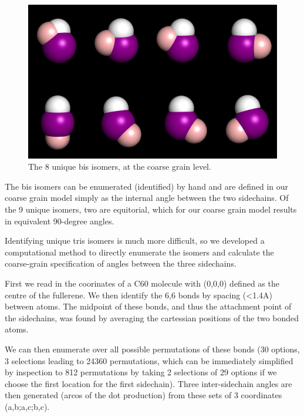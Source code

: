 \documentclass[journal=nanofd,manuscript=suppinfo]{achemso}
\begin{document}
\begin{figure}[ht!]
    \begin{center}
        \includegraphics[width=\textwidth]{bis_8_isomers_ray.png}
            \caption{\label{fig-8bisCG}The 8 unique bis isomers, at the coarse grain level.}
    \end{center}
\end{figure}

The bis isomers can be enumerated (identified) by hand and are defined in our
coarse grain model simply as the internal angle between the two sidechains. Of
the 9 unique isomers, two are equitorial, which for our coarse grain model
results in equivalent 90-degree angles.



Identifying unique tris isomers is much more difficult, so we developed
a computational method to directly enumerate the isomers and calculate the
coarse-grain specification of angles between the three sidechains.

First we read in the coorinates of a C60 molecule with (0,0,0) defined as the
centre of the fullerene. We then identify the 6,6 bonds by spacing (<1.4A)
between atoms.
The midpoint of these bonds, and thus the attachment point of the sidechains,
was found by averaging the cartessian positions of the two bonded atoms.

We can then enumerate over all possible permutations of these bonds (30
options, 3 selections leading to 24360 permutations, which can be immediately
simplified by inspection to 812 permutations by taking 2 selections of 29
options if we choose the first location for the first sidechain).
Three inter-sidechain angles are then generated (arcos of the dot production)
from these sets of 3 coordinates (a,b;a,c;b,c).
\end{document}
